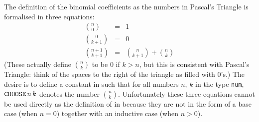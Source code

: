 The definition of the binomial coefficients as the numbers in Pascal's Triangle
is formalised in three equations:
\begin{eqnarray*}
n \choose 0 &=& 1 \\
0 \choose {k+1} &=& 0 \\
{n+1} \choose {k+1} &=& {{n} \choose {k+1}} + {{n} \choose {k}}
\end{eqnarray*}
(These actually define $n \choose k$ to be $0$ if $k>n$, but this is
consistent with Pascal's Triangle: think of the spaces to the right of
the triangle as filled with $0$'s.) The desire is to define a constant
\verb@CHOOSE@ in \HOL{} such that for all numbers $n$, $k$ in the type
{\tt num}, $\verb@CHOOSE@\,n\,k$ denotes the number $n \choose k$.
Unfortunately these three equations cannot be used directly as the definition
of \verb@CHOOSE@ in \HOL{} because they are not in the form of a base case
(when $n=0$) together with an inductive case (when $n>0$).


